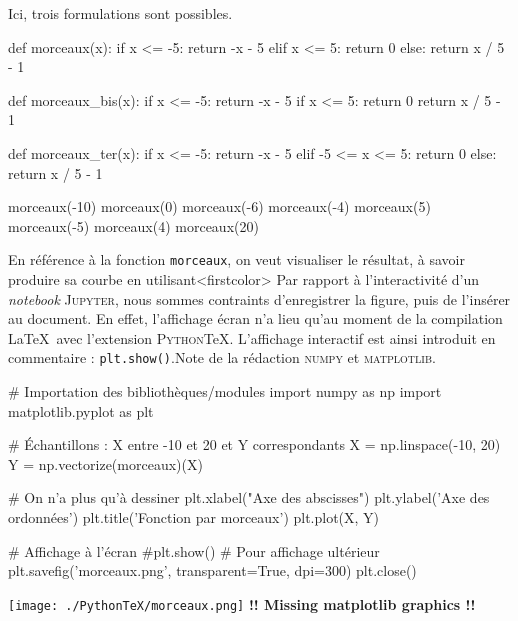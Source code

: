 \begin{solution}
Ici, trois formulations sont possibles.
\begin{idleconsole}
\begin{pyconsole}
def morceaux(x):
    if x <= -5:
        return -x - 5
    elif x <= 5:
        return 0
    else:
        return x / 5 - 1

def morceaux_bis(x):
    if x <= -5:
        return -x - 5
    if x <= 5:
        return 0
    return x / 5 - 1

def morceaux_ter(x):
    if x <= -5:
        return -x - 5
    elif -5 <= x <= 5:
        return 0
    else:
        return x / 5 - 1

morceaux(-10)
morceaux(0)
morceaux(-6)
morceaux(-4)
morceaux(5)
morceaux(-5)
morceaux(4)
morceaux(20)
\end{pyconsole}
\end{idleconsole}


En référence à la fonction \texttt{morceaux}, on veut visualiser le résultat, à savoir produire sa courbe en utilisant\caution[t]<firstcolor>{%
Par rapport à l'interactivité d'un \textit{notebook} \textsc{Jupyter}, nous sommes contraints d'enregistrer la figure, puis de l'insérer au document. En effet, l'affichage écran n'a lieu qu'au moment de la compilation \LaTeX\ avec l’extension \textsc{Python}\TeX{}. L'affichage interactif est ainsi introduit en commentaire : \texttt{plt.show()}.}{Note de la rédaction}
 \textsc{numpy} et \textsc{matplotlib}. 

\begin{idleconsole}
\begin{pyconsole}
# Importation des bibliothèques/modules
import numpy as np
import matplotlib.pyplot as plt

# Échantillons : X entre -10 et 20 et Y correspondants
X = np.linspace(-10, 20) 
Y = np.vectorize(morceaux)(X)

# On n'a plus qu'à dessiner
plt.xlabel("Axe des abscisses")
plt.ylabel('Axe des ordonnées')
plt.title('Fonction par morceaux')
plt.plot(X, Y)

# Affichage à l'écran
#plt.show() 
# Pour affichage ultérieur
plt.savefig('morceaux.png', transparent=True, dpi=300)
plt.close()
\end{pyconsole}
\end{idleconsole}


\begin{center}
\vspace{-0.75\baselineskip}
%
  {\texttt{[image: ./PythonTeX/morceaux.png]}}%
  {\textbf{!! Missing matplotlib graphics !!}}%
\end{center}
\vspace{-0.75\baselineskip}
\end{solution}

